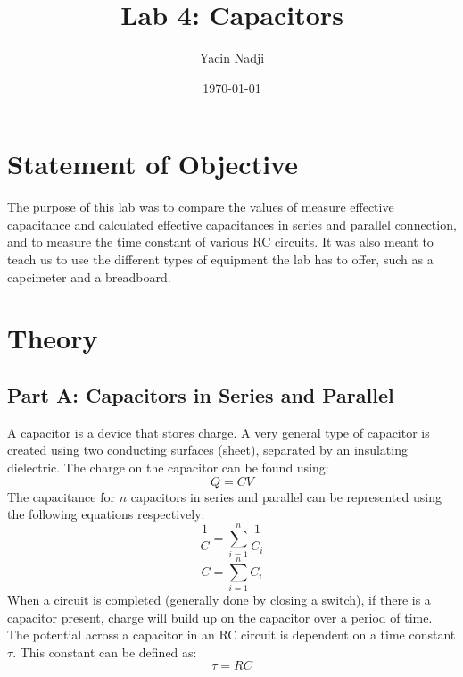 \documentclass[titlepage]{article}
\title{Lab 4: Capacitors}
\author{Yacin Nadji}
\date{\today}
\begin{document}
\maketitle

\section{Statement of Objective}\label{sec:obj}
The purpose of this lab was to compare the values of measure effective capacitance and calculated effective capacitances in series and parallel connection, and to measure the time constant of various RC circuits. It was also meant to teach us to use the different types of equipment the lab has to offer, such as a capcimeter and a breadboard.

\section{Theory}\label{sec:theory}
\subsection{Part A: Capacitors in Series and Parallel}\label{sub:part_a-theory}
A capacitor is a device that stores charge. A very general type of capacitor is created using two conducting surfaces (sheet), separated by an insulating dielectric. The charge on the capacitor can be found using:
\begin{equation}
	Q = CV
\end{equation}
The capacitance for $n$ capacitors in series and parallel can be represented using the following equations respectively:
\begin{equation}
	\frac{1}{C} = \sum_{i = 1}^n \frac{1}{C_i}
\end{equation}
\begin{equation}
	C = \sum_{i = 1}^n C_i
\end{equation}
When a circuit is completed (generally done by closing a switch), if there is a capacitor present, charge will build up on the capacitor over a period of time. The potential across a capacitor in an RC circuit is dependent on a time constant $\tau$. This constant can be defined as:
\begin{equation}
	\tau = RC
\end{equation}
\end{document}
